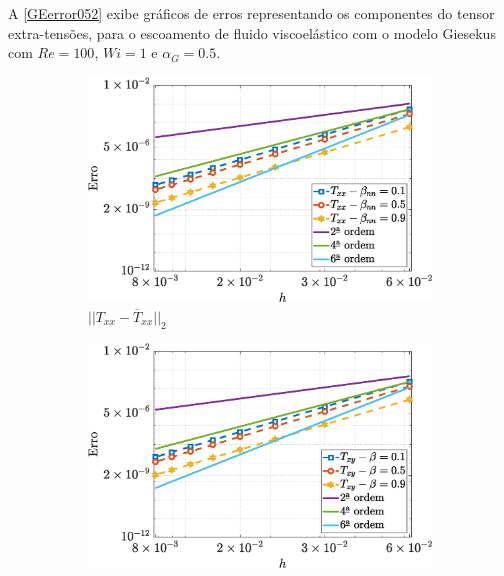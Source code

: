 A \autoref{GEerror052} exibe gráficos de erros representando os componentes do tensor extra-tensões, para o escoamento de fluido viscoelástico com o modelo Giesekus com $Re=100$, $Wi=1$ e $\alpha_G=0.5$.
\begin{figure}[H] 
    \centering
    \caption{Erro para os componentes dos tensores extra-tensões, utilizando os parâmetros $Re=100,$ $Wi=1$ e $\alpha_{G} = 0.5$, para o escoamento de fluido viscoelástico Giesekus}\label{GEerror052}
    \begin{subfigure}[b]{.47\textwidth}
        \includegraphics[width=\textwidth]{figures/Case12/Giesekus/Errors/NormErr_2nd_Re_100_Wi_1_epsilon_0_xi_0_alphaG_0.1_Dt_1e-06_at_0.05_tipsim_1_MMS_12_Txx.eps}
        \caption{$||T_{xx} - \overline{T}_{xx}||_{2}$}
        \label{error_txx_2nd_Case1_giesekus_alphaG_0.5}
    \end{subfigure}
    \vspace{0.2cm}
    \qquad
    \begin{subfigure}[b]{.47\textwidth}
        \includegraphics[width=\textwidth]{figures/Case12/Giesekus/Errors/NormErr_2nd_Re_100_Wi_1_epsilon_0_xi_0_alphaG_0.1_Dt_1e-06_at_0.05_tipsim_1_MMS_12_Txy.eps}

\end{subfigure}
\end{figure}
